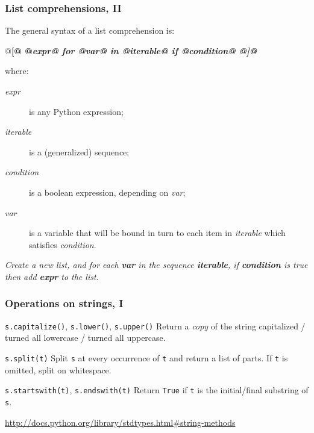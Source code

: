 \documentclass[english,serif,mathserif,xcolor=pdftex,dvipsnames,table]{beamer}
\begin{document}
\begin{frame}[fragile]
  \frametitle{List comprehensions, II}
  \def\e{\ttfamily\itshape}

  The general syntax of a list comprehension is:
  \begin{python}
    @\bf[@ @\e expr@ for @\e var@ in @\e iterable@ if @\e condition@ @\bf]@
  \end{python}
  where:
  \begin{description}
  \item[\e expr] is any Python expression;
  \item[\e iterable] is a (generalized) sequence;
  \item[\e condition] is a boolean expression, depending on
    {\e var};
  \item[\e var] is a variable that will be bound in turn to each item
    in {\e iterable} which satisfies {\e condition}.
  \end{description}

  \+ \textit{Create a new list, and for each \textbf{var} in the
    sequence \textbf{iterable}, if \textbf{condition} is true then add
    \textbf{expr} to the list.}
\end{frame}


\begin{frame}[fragile]
  \frametitle{Operations on strings, I}
  \begin{describe}{%
      \lstinline|s.capitalize()|,
      \lstinline|s.lower()|,
      \lstinline|s.upper()|}
    Return a \emph{copy} of the string capitalized / turned all lowercase /
    turned all uppercase.
  \end{describe}

  \begin{describe}{\lstinline|s.split(t)|}
    Split \texttt{s} at every occurrence of \texttt{t} and return a list
    of parts.  If \texttt{t} is omitted, split on whitespace.
  \end{describe}

  \begin{describe}{\lstinline|s.startswith(t)|,
      \lstinline|s.endswith(t)|}
    Return \texttt{True} if \texttt{t} is the initial/final substring
    of \texttt{s}.
  \end{describe}

  \begin{references}
    \url{http://docs.python.org/library/stdtypes.html#string-methods}
  \end{references}
\end{frame}
\end{document}
